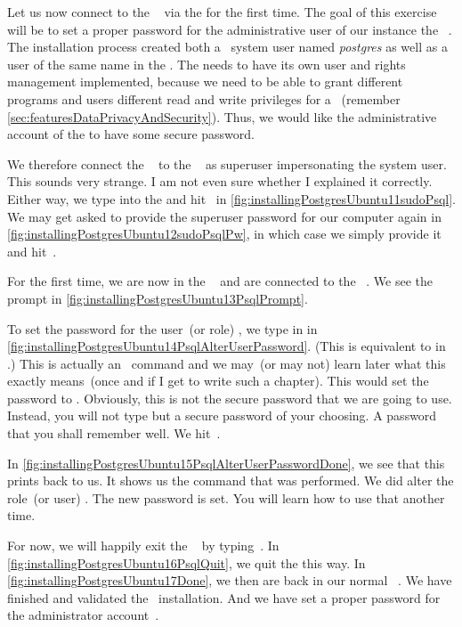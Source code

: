 Let us now connect to the \postgresql\  via the  for the first time.
The goal of this exercise will be to set a proper password for the administrative user of our instance the \postgresql\ .
The installation process created both a \linux\ system user named \textit{postgres} as well as a user of the same name in the .
The  needs to have its own user and rights management implemented, because we need to be able to grant different programs and users different read and write privileges for a ~(remember \cref{sec:featuresDataPrivacyAndSecurity}).
Thus, we would like the administrative account  of the  to have some secure password.

We therefore connect the \psql\  to the \postgresql\  as superuser impersonating the  system user.
This sounds very strange.
I am not even sure whether I explained it correctly.
Either way, we type  into the  and hit~\keys{\enter} in \cref{fig:installingPostgresUbuntu11sudoPsql}.
We may get asked to provide the superuser password for our computer again in \cref{fig:installingPostgresUbuntu12sudoPsqlPw}, in which case we simply provide it and hit~\keys{\enter}.

For the first time, we are now in the \psql\  and are connected to the \postgresql\ .
We see the prompt \expandafter{} in \cref{fig:installingPostgresUbuntu13PsqlPrompt}.%
%
\begin{sloppypar}%
To set the password for the user~(or role) , we type in  in \cref{fig:installingPostgresUbuntu14PsqlAlterUserPassword}.
(This is equivalent to  in \postgresql.)
This is actually an \sql\ command and we may~(or may not) learn later what this exactly means~(once and if I get to write such a chapter).
This would set the password to .
Obviously, this is not the secure password that we are going to use.
Instead, you will not type  but a secure password of your choosing.
A password that you shall remember well.
We hit~\keys{\enter}.%
\end{sloppypar}%
%
In \cref{fig:installingPostgresUbuntu15PsqlAlterUserPasswordDone}, we see that this prints  back to us.
It shows us the command that was performed.
We did alter the role~(or user) .
The new password is set.
You will learn how to use that another time.

For now, we will happily exit the \psql\  by typing~.
In \cref{fig:installingPostgresUbuntu16PsqlQuit}, we quit the  this way.
In \cref{fig:installingPostgresUbuntu17Done}, we then are back in our normal \bash\ .
We have finished and validated the \postgresql\ installation.
And we have set a proper password for the administrator account~.%
%
\FloatBarrier%
\endhsection%
%
